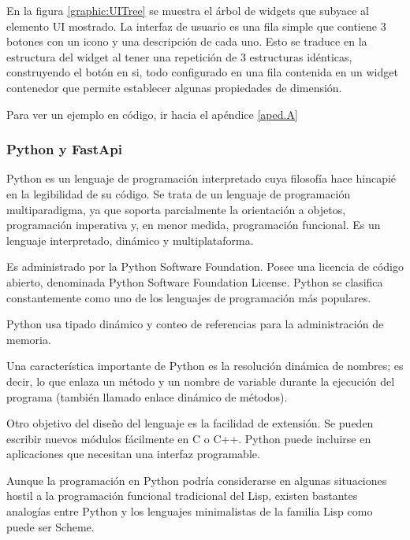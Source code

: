 En la figura \ref{graphic:UITree} se muestra el árbol de widgets que subyace al elemento UI mostrado. La interfaz de usuario es una fila simple que contiene 3 botones con un icono y una descripción de cada uno. Esto se traduce en la estructura del widget al tener una repetición de 3 estructuras idénticas, construyendo el botón en si, todo configurado en una fila contenida en un widget contenedor que permite establecer algunas propiedades de dimensión.

Para ver un ejemplo en código, ir hacia el apéndice \ref{aped.A}

\subsubsection{Python y FastApi}
Python es un lenguaje de programación interpretado cuya filosofía hace hincapié en la legibilidad de su código. Se trata de un lenguaje de programación multiparadigma, ya que soporta parcialmente la orientación a objetos, programación imperativa y, en menor medida, programación funcional. Es un lenguaje interpretado, dinámico y multiplataforma.

Es administrado por la Python Software Foundation. Posee una licencia de código abierto, denominada Python Software Foundation License. Python se clasifica constantemente como uno de los lenguajes de programación más populares.

Python usa tipado dinámico y conteo de referencias para la administración de memoria.

Una característica importante de Python es la resolución dinámica de nombres; es decir, lo que enlaza un método y un nombre de variable durante la ejecución del programa (también llamado enlace dinámico de métodos).

Otro objetivo del diseño del lenguaje es la facilidad de extensión. Se pueden escribir nuevos módulos fácilmente en C o C++. Python puede incluirse en aplicaciones que necesitan una interfaz programable.

Aunque la programación en Python podría considerarse en algunas situaciones hostil a la programación funcional tradicional del Lisp, existen bastantes analogías entre Python y los lenguajes minimalistas de la familia Lisp como puede ser Scheme.

